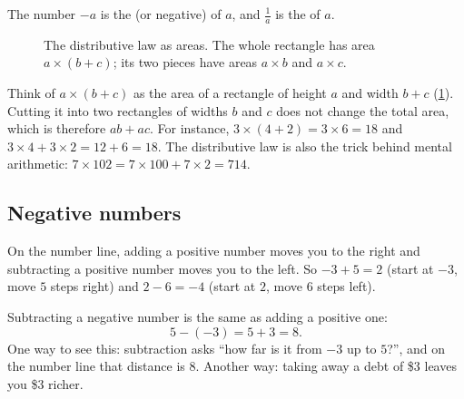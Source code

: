 The number $-a$ is the  (or negative) of $a$, and
$\tfrac1a$ is the  of $a$.

\begin{figure}[htbp]
\centering
{}
\caption{The distributive law as areas. The whole rectangle has area
  $a\times(b+c)$; its two pieces have areas $a\times b$ and $a\times c$.}
\label{fig:distributive}
\end{figure}

\begin{intuition}
Think of $a \times (b+c)$ as the area of a rectangle of height $a$ and width
$b + c$ (\cref{fig:distributive}). Cutting it into two rectangles of widths $b$
and $c$ does not change the total area, which is therefore $ab + ac$. For
instance, $3 \times (4 + 2) = 3\times 6 = 18$ and $3\times4 + 3\times2 = 12 + 6
= 18$. The distributive law is also the trick behind mental arithmetic:
$7 \times 102 = 7\times100 + 7\times 2 = 714$.
\end{intuition}

\subsection{Negative numbers}

On the number line, adding a positive number moves you to the right and
subtracting a positive number moves you to the left. So $-3 + 5 = 2$ (start at
$-3$, move $5$ steps right) and $2 - 6 = -4$ (start at $2$, move $6$ steps
left).

Subtracting a negative number is the same as adding a positive one:
\[
  5 - (-3) = 5 + 3 = 8.
\]
One way to see this: subtraction asks ``how far is it from $-3$ up to $5$?'',
and on the number line that distance is $8$. Another way: taking away a debt of
\$3 leaves you \$3 richer.

